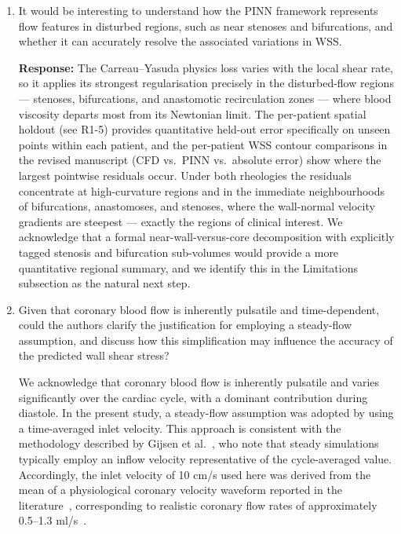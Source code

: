 \documentclass[11pt]{article}
\begin{document}
\begin{enumerate}[]
    \textbf{Response:} \textit{[CFD co-authors --- to be completed: provide the quantitative mesh-convergence study (GCI) in the Supplementary Material.]}
    \vspace{2cm}

    \item It would be interesting to understand how the PINN framework represents flow features in disturbed regions, such as near stenoses and bifurcations, and whether it can accurately resolve the associated variations in WSS.

    \textbf{Response:} The Carreau--Yasuda physics loss varies with the local shear rate, so it applies its strongest regularisation precisely in the disturbed-flow regions --- stenoses, bifurcations, and anastomotic recirculation zones --- where blood viscosity departs most from its Newtonian limit. The per-patient spatial holdout (see R1-5) provides quantitative held-out error specifically on unseen points within each patient, and the per-patient WSS contour comparisons in the revised manuscript (CFD vs.\ PINN vs.\ absolute error) show where the largest pointwise residuals occur. Under both rheologies the residuals concentrate at high-curvature regions and in the immediate neighbourhoods of bifurcations, anastomoses, and stenoses, where the wall-normal velocity gradients are steepest --- exactly the regions of clinical interest. We acknowledge that a formal near-wall-versus-core decomposition with explicitly tagged stenosis and bifurcation sub-volumes would provide a more quantitative regional summary, and we identify this in the Limitations subsection as the natural next step.

    \item Given that coronary blood flow is inherently pulsatile and time-dependent, could the authors clarify the justification for employing a steady-flow assumption, and discuss how this simplification may influence the accuracy of the predicted wall shear stress?

  We acknowledge that coronary blood flow is inherently pulsatile and varies significantly over the cardiac cycle, with a dominant contribution during diastole. In the present study, a steady-flow assumption was adopted by using a time-averaged inlet velocity. This approach is consistent with the methodology described by Gijsen et al.~\cite{Gijsen2019}, who note that steady simulations typically employ an inflow velocity representative of the cycle-averaged value. Accordingly, the inlet velocity of 10 cm/s used here was derived from the mean of a physiological coronary velocity waveform reported in the literature~\cite{Simon1982}, corresponding to realistic coronary flow rates of approximately 0.5–1.3 ml/s~\cite{Khan2020}.


\end{enumerate}
\end{document}
